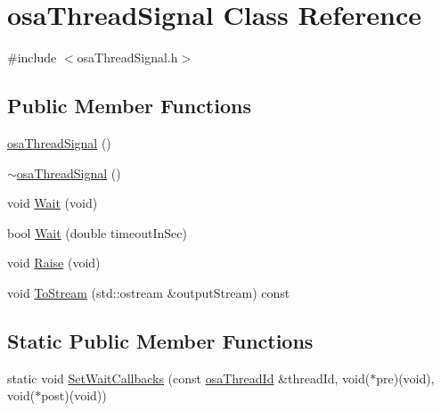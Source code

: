 \hypertarget{classosa_thread_signal}{\section{osa\-Thread\-Signal Class Reference}
\label{classosa_thread_signal}
}


{\ttfamily \#include $<$osa\-Thread\-Signal.\-h$>$}

\subsection*{Public Member Functions}
\begin{DoxyCompactItemize}
\item 
\hyperlink{classosa_thread_signal_afb91cea91d17650ffcd67daeb347e399}{osa\-Thread\-Signal} ()
\item 
\hyperlink{classosa_thread_signal_a9fb82ffdc732148decfc5453d6f6eb57}{$\sim$osa\-Thread\-Signal} ()
\item 
void \hyperlink{classosa_thread_signal_a610c820eeae1275b5f7dc3fff316bdc6}{Wait} (void)
\item 
bool \hyperlink{classosa_thread_signal_a424192ab9c92f856c1bdefde93792731}{Wait} (double timeout\-In\-Sec)
\item 
void \hyperlink{classosa_thread_signal_aaf9954186fff5b97e7418aa040e71930}{Raise} (void)
\item 
void \hyperlink{classosa_thread_signal_ac1d0c8f67566f8f1c5832bc3691c6530}{To\-Stream} (std\-::ostream \&output\-Stream) const 
\end{DoxyCompactItemize}
\subsection*{Static Public Member Functions}
\begin{DoxyCompactItemize}
\item 
static void \hyperlink{classosa_thread_signal_ad48014fbc5bfe0925ce170405758e730}{Set\-Wait\-Callbacks} (const \hyperlink{classosa_thread_id}{osa\-Thread\-Id} \&thread\-Id, void($\ast$pre)(void), void($\ast$post)(void))
\end{DoxyCompactItemize}


